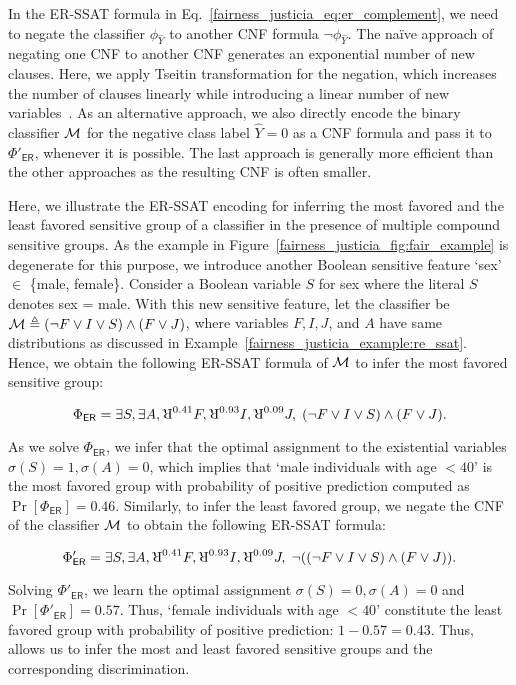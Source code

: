 In the ER-SSAT formula in Eq.~\eqref{fairness_justicia_eq:er_complement}, we need to negate the classifier $ \phi_{\hat{Y}} $ to another CNF formula $ \neg \phi_{\hat{Y}} $. The na\"ive approach of negating one CNF to another CNF generates an exponential number of new clauses. Here, we apply Tseitin transformation for the negation, which increases the number of clauses linearly while introducing a linear number of new variables~\cite{tseitin1983complexity}. As an alternative approach, we also directly encode the binary classifier $\mathcal{M}$ for the negative class label $\hat{Y} = 0$ as a CNF formula and pass it to $\Phi'_{\mathsf{ER}} $, whenever it is possible. The last approach is generally more efficient than the other approaches as the resulting CNF is often smaller.  






\begin{example}
	\label{fairness_justicia_example:er_ssat}
	Here, we illustrate the ER-SSAT encoding for inferring the most favored and the least favored sensitive group of a classifier in the presence of multiple compound sensitive groups. As the example in Figure~\ref{fairness_justicia_fig:fair_example} is degenerate for this purpose, we introduce another Boolean sensitive feature `sex' $ \in $ \{male, female\}. Consider a Boolean variable $ S $ for sex where the literal $ S $ denotes sex = male. With this new sensitive feature, let the classifier be  $\mathcal{M} \triangleq (\neg F \vee I \vee S) \wedge (F \vee J)$, where variables $ F,I,J $, and $ A $ have same distributions as discussed in Example~\ref{fairness_justicia_example:re_ssat}. Hence, we obtain the following ER-SSAT formula of $\mathcal{M}$ to infer the most favored sensitive group:
	
	\[ \Phi_{\mathsf{ER}} =  \exists S,\exists A, \R^{0.41}F, \R^{0.93}I, \R^{0.09}J, \; (\neg F \vee I \vee S) \wedge (F \vee J).
	\]
	
	As we solve $ \Phi_{\mathsf{ER}} $, we infer that the optimal assignment to the existential variables $ \sigma(S) = 1, \sigma(A) = 0$, which implies that `male individuals with age $ < 40 $' is the most favored group with probability of positive prediction computed as $ \Pr[\Phi_{\mathsf{ER}}] = 0.46$. Similarly, to infer the least favored group, we negate the CNF of the classifier $\mathcal{M}$ to obtain the following ER-SSAT formula:
	
	\[\Phi'_{\mathsf{ER}} =  \exists S, \exists A, \R^{0.41}F, \R^{0.93}I, \R^{0.09}J, \; \neg((\neg F \vee I \vee S) \wedge (F \vee J)).
	\]
	
	Solving $ \Phi'_{\mathsf{ER}} $, we learn the optimal assignment $ \sigma(S) = 0, \sigma(A) = 0  $ and $  \Pr[\Phi'_{\mathsf{ER}}] = 0.57 $. Thus, `female individuals with age $ < 40 $' constitute the least favored group with probability of positive prediction:  $ 1-0.57 = 0.43$. 
	Thus, {\justicialearn} allows us to infer the most and least favored sensitive groups and the corresponding discrimination.
\end{example}

